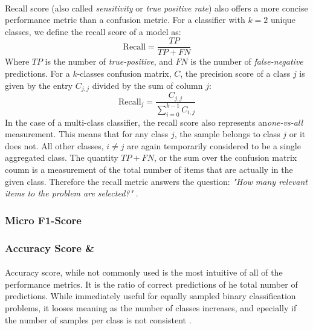 \documentclass[12pt,letterpaper]{article}
\begin{document}
\paragraph*{}Recall score (also called \textit{sensitivity} or \textit{true positive rate}) also offers a more concise performance metric than a confusion metric. For a classifier with $k = 2$ unique classes, we define the recall score of a model as:
\begin{equation}
\label{eqn-BinaryRecall}
\text{Recall} = \frac{TP}{TP + FN}
\end{equation}
Where $TP$ is the number of \textit{true-positive}, and $FN$ is the number of \textit{false-negative} predictions. For a $k$-classes confusion matrix, $C$, the precision score of a class $j$ is given by the entry $C_{j,j}$ divided by the sum of column $j$:
\begin{equation}
\label{eqn-KRecall}
\text{Recall}_j = \frac{C_{j,j}}{\sum_{i=0}^{k-1}C_{i,j}}
\end{equation}
In the case of a multi-class classifier, the recall score also represents an\textit{one-vs-all} measurement. This means that for any class $j$, the sample belongs to class $j$ or it does not. All other classes, $i \neq j$ are again temporarily considered to be a single aggregated class. The quantity $TP + FN$, or the sum over the confusion matrix coumn is a measurement of the total number of items that are actually in the given class. Therefore the recall metric answers the question: \textit{"How many relevant items to the problem are selected?"} \cite{Geron,James}.


\subsubsection{Micro F1-Score}


\subsubsection{Accuracy Score \&}

\paragraph*{}Accuracy score, while not commonly used is the most intuitive of all of the performance metrics. It is the ratio of correct predictions of he total number of predictions. While immediately useful for equally sampled binary classification problems, it looses meaning as the number of classes increases, and epecially if the number of samples per class is not consistent \cite{Geron}.
\end{document}
